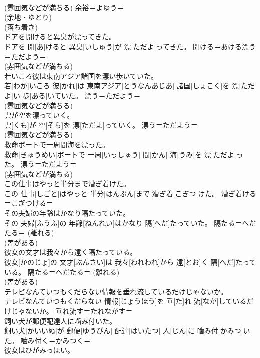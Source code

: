 \documentclass[8pt]{extreport}
\begin{document}
\begin{CJK}{UTF8}{min}
{\\	(雰囲気などが満ちる) 余裕＝よゆう＝ 
\\	(余地・ゆとり) 
\\	(落ち着き) 
\\	ドアを開けると異臭が漂ってきた。	
\\	ドアを 開[あ]けると 異臭[いしゅう]が 漂[ただよ]ってきた。	開ける＝あける漂う＝ただよう＝ 
\\	(雰囲気などが満ちる)
\\	若いころ彼は東南アジア諸国を漂い歩いていた。	
\\	若[わか]いころ 彼[かれ]は 東南アジア[とうなんあじあ] 諸国[しょこく]を 漂[ただよ]い 歩[ある]いていた。	漂う＝ただよう＝ 
\\	(雰囲気などが満ちる)
\\	雲が空を漂っていく。	
\\	雲[くも]が 空[そら]を 漂[ただよ]っていく。	漂う＝ただよう＝ 
\\	(雰囲気などが満ちる)
\\	救命ボートで一周間海を漂った。	
\\	救命[きゅうめい]ボートで 一周[いっしゅう] 間[かん] 海[うみ]を 漂[ただよ]った。	漂う＝ただよう＝ 
\\	(雰囲気などが満ちる)
\\	この仕事はやっと半分まで漕ぎ着けた。	
\\	この 仕事[しごと]はやっと 半分[はんぶん]まで 漕ぎ着[こぎつ]けた。	漕ぎ着ける＝こぎつける＝ 
\\	その夫婦の年齢はかなり隔たっていた。	
\\	その 夫婦[ふうふ]の 年齢[ねんれい]はかなり 隔[へだ]たっていた。	隔たる＝へだたる＝ (離れる) 
\\	(差がある) 
\\	彼女の文才は我々から遠く隔たっている。	
\\	彼女[かのじょ]の 文才[ぶんさい]は 我々[われわれ]から 遠[とお]く 隔[へだ]たっている。	隔たる＝へだたる＝ (離れる) 
\\	(差がある) 
\\	テレビなんていつもくだらない情報を垂れ流しているだけじゃないか。	
\\	テレビなんていつもくだらない 情報[じょうほう]を 垂[た]れ 流[なが]しているだけじゃないか。	垂れ流す＝たれながす＝ 
\\	飼い犬が郵便配達人に噛み付いた。	
\\	飼い犬[かいいぬ]が 郵便[ゆうびん] 配達[はいたつ] 人[じん]に 噛み付[かみつ]いた。	噛み付く＝かみつく＝ 
\\	彼女はひがみっぽい。	
}
\end{CJK}
\end{document}
